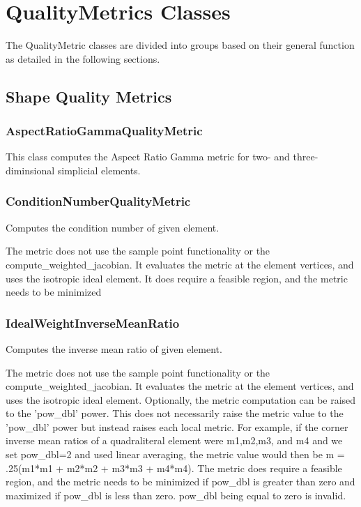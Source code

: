 \section{QualityMetrics Classes}

The QualityMetric classes are divided into groups based on their general function as detailed in the following sections.

\subsection{Shape Quality Metrics}

\subsubsection{AspectRatioGammaQualityMetric}

This class computes the Aspect Ratio Gamma metric for two- and three-diminsional simplicial elements.

\subsubsection{ConditionNumberQualityMetric}

  Computes the condition number of given element. 

     The metric does not use the sample point functionality or the compute\_weighted\_jacobian.  It evaluates the metric at  the element vertices, and uses the isotropic ideal element. It does require a feasible region, and the metric needs to be minimized

\subsubsection{IdealWeightInverseMeanRatio}

Computes the inverse mean ratio of given element.

The metric does not use the sample point functionality or the compute\_weighted\_jacobian.  It evaluates the metric at the element vertices, and uses the isotropic ideal element.  Optionally, the metric computation can be raised to the 'pow\_dbl' power.  This does not necessarily raise the metric value to the 'pow\_dbl' power but instead raises each local metric.  For example, if the corner inverse mean ratios of a quadraliteral element were m1,m2,m3, and m4 and we set pow\_dbl=2 and used linear averaging, the metric value would then be m = .25(m1*m1 + m2*m2 + m3*m3 + m4*m4).  The metric does require a feasible region, and the metric needs to be minimized if pow\_dbl is greater than zero and maximized if pow\_dbl is less than zero.  pow\_dbl being equal to zero is invalid.

